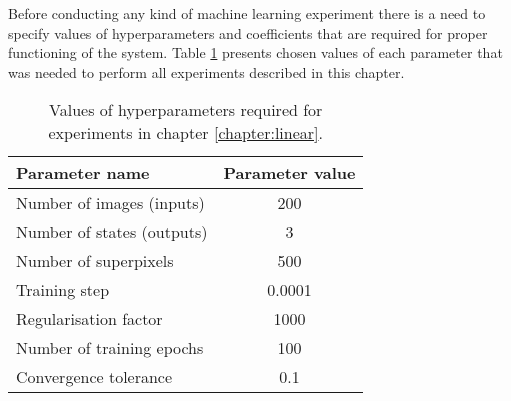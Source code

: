 Before conducting any kind of machine learning experiment there is a need to specify values of hyperparameters and coefficients that are required for proper functioning of the system. Table \ref{table:hyperparameters_linear} presents chosen values of each parameter that was needed to perform all experiments described in this chapter.
\begin{table}[ht]
    \caption{Values of hyperparameters required for experiments in chapter \ref{chapter:linear}.}
    \centering
    \begin{tabular}{|l|c|}
        \hline
        \rowcolor[HTML]{C0C0C0} 
        \textbf{Parameter name} & \textbf{Parameter value} \\ \hline
        Number of images (inputs) & 200 \\ \hline
        Number of states (outputs) & 3 \\ \hline
        Number of superpixels & 500 \\ \hline
        Training step & 0.0001 \\ \hline
        Regularisation factor & 1000 \\ \hline
        Number of training epochs & 100 \\ \hline
        Convergence tolerance & 0.1 \\ \hline
    \end{tabular}
    \label{table:hyperparameters_linear}
\end{table}

